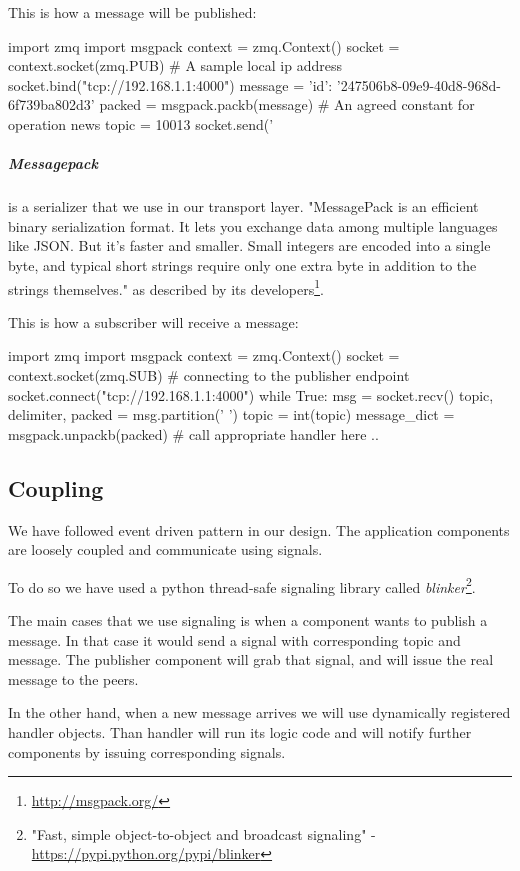 This is how a message will be published:
\begin{python}
import zmq
import msgpack
context = zmq.Context()
socket = context.socket(zmq.PUB)
# A sample local ip address
socket.bind("tcp://192.168.1.1:4000") 
message = {'id': '247506b8-09e9-40d8-968d-6f739ba802d3'}
packed = msgpack.packb(message)
# An agreed constant for operation news
topic = 10013
socket.send('%
\end{python}

\subparagraph{Messagepack} is a serializer that we use in our transport layer. 
"MessagePack is an efficient binary serialization format. 
It lets you exchange data among multiple languages like JSON.
But it's faster and smaller. 
Small integers are encoded into a single byte, 
and typical short strings require only one extra byte in addition to the strings themselves."
as described by its developers\footnote{\url{http://msgpack.org/}}.

This is how a subscriber will receive a message:
\begin{python}
import zmq
import msgpack
context = zmq.Context()
socket = context.socket(zmq.SUB)
# connecting to the publisher endpoint
socket.connect("tcp://192.168.1.1:4000")
while True:
    msg = socket.recv()
    topic, delimiter, packed = msg.partition(' ')
    topic = int(topic)
    message_dict = msgpack.unpackb(packed)
    # call appropriate handler here ..
\end{python}

\subsection{Coupling}
We have followed event driven pattern in our design.
The application components are loosely coupled and communicate using signals.

To do so we have used a python thread-safe signaling library 
called \textit{blinker}\footnote{"Fast, simple object-to-object and broadcast signaling" -
\url{https://pypi.python.org/pypi/blinker}}.

The main cases that we use signaling is when a component wants to publish a message. 
In that case it would send a signal with corresponding topic and message. 
The publisher component will grab that signal, and will issue the real message to the peers.

In the other hand, when a new message arrives we will use dynamically registered handler objects.
Than handler will run its logic code and will notify further components by issuing corresponding signals.

